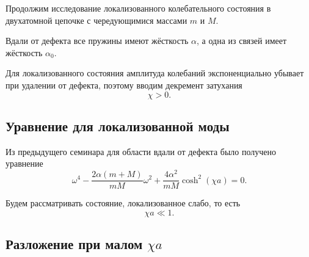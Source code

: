 \documentclass[../final.tex]{subfiles}
\begin{document}





Продолжим исследование локализованного колебательного состояния
в двухатомной цепочке с чередующимися массами $m$ и $M$.

Вдали от дефекта все пружины имеют жёсткость $\alpha$,
а одна из связей имеет жёсткость $\alpha_0$.

Для локализованного состояния амплитуда колебаний
экспоненциально убывает при удалении от дефекта,
поэтому вводим декремент затухания
%
\begin{equation*}
    \chi>0.
\end{equation*}



\subsection*{Уравнение для локализованной моды}

Из предыдущего семинара для области вдали от дефекта
было получено уравнение
%
\begin{equation*}
    \omega^4
    -
    \frac{2\alpha(m+M)}{mM}\omega^2
    +
    \frac{4\alpha^2}{mM}
    \cosh^2(\chi a)
    =
    0.
\end{equation*}
%

Будем рассматривать состояние,
локализованное слабо, то есть
%
\begin{equation*}
    \chi a\ll1.
\end{equation*}



\subsection*{Разложение при малом $\chi a$}
\end{document}
